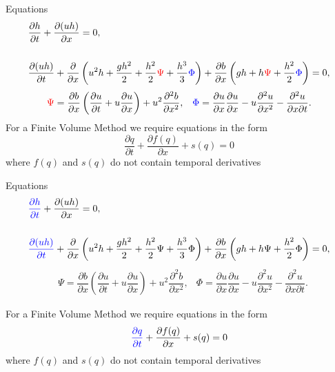\documentclass[]{beamer}
\begin{document}
\begin{frame}{Equations}
		\begin{subequations}
			\begin{align*}
			&\frac{\partial h}{\partial t} + \dfrac{\partial (uh)}{\partial x} = 0,  \\ \\
			&\dfrac{\partial (uh)}{\partial t} + \dfrac{\partial}{\partial x} \left ( u^2h + \dfrac{gh^2}{2} + \dfrac{h^2}{2}{ \color{red}\Psi } + \dfrac{h^3}{3}{ { \color{blue} \Phi } }  \right )  +  \dfrac{\partial b}{\partial x} \left (gh +   h { \color{red}\Psi } + \dfrac{h^2}{2}{ { \color{blue} \Phi } }  \right ) = 0,
			\end{align*}
		\end{subequations}
				\begin{align*}
				&{ \color{red}\Psi }  = \dfrac{\partial b}{\partial x}\left(\dfrac{\partial u}{\partial t} + u\dfrac{\partial u}{\partial x} \right)  + u^2\dfrac{\partial^2 b}{\partial x^2}, &
				{ \color{blue} \Phi }  = \dfrac{\partial u }{\partial x} \dfrac{\partial u}{\partial x} -u \dfrac{\partial^2 u}{\partial x^2}  - \dfrac{\partial^2 u}{\partial x \partial t} .
				\end{align*}
	\pause
	For a Finite Volume Method we require equations in the form
	\begin{equation*}
	\frac{\partial q}{\partial t} + \frac{\partial f(q)}{\partial x} + s(q) = 0
	\end{equation*}
	where $f(q)$ and $s(q)$ do not contain temporal derivatives
\end{frame}

\begin{frame}{Equations}
	\begin{subequations}
		\begin{align*}
		& {\color{blue}\frac{\partial h}{\partial t}} + \dfrac{\partial (uh)}{\partial x} = 0,  \\ \\
		& {\color{blue}\dfrac{\partial (uh)}{\partial t}} + \dfrac{\partial}{\partial x} \left ( u^2h + \dfrac{gh^2}{2} + \dfrac{h^2}{2}{\Psi } + \dfrac{h^3}{3}{ { \Phi } }  \right )  +  \dfrac{\partial b}{\partial x} \left (gh +   h {\Psi } + \dfrac{h^2}{2}{ {  \Phi } }  \right ) = 0,
		\end{align*}
	\end{subequations}
	\begin{align*}
	&{ \Psi }  = \dfrac{\partial b}{\partial x}\left(\dfrac{\partial u}{\partial t} + u\dfrac{\partial u}{\partial x} \right)  + u^2\dfrac{\partial^2 b}{\partial x^2}, &
	{  \Phi }  = \dfrac{\partial u }{\partial x} \dfrac{\partial u}{\partial x} -u \dfrac{\partial^2 u}{\partial x^2}  - \dfrac{\partial^2 u}{\partial x \partial t} .
	\end{align*}

	For a Finite Volume Method we require equations in the form
	\begin{equation*}
	{\color{blue}\frac{\partial q}{\partial t}} + \frac{\partial f(q)}{\partial x} + s(q) = 0
	\end{equation*}
	where $f(q)$ and $s(q)$ do not contain temporal derivatives
\end{frame}
\end{document}
